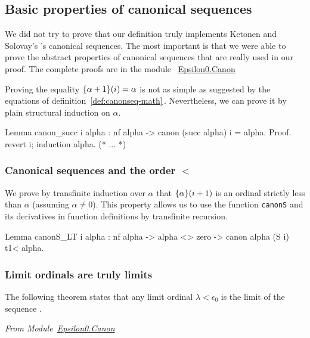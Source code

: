 \subsection{Basic properties of canonical sequences}

We did not  try to prove that our definition truly implements Ketonen and Solovay's  \cite{KS81}'s canonical sequences. The most important is that we were able to prove the 
abstract properties  of canonical sequences that are really used in our proof. The complete proofs are in the module
~\href{../theories/html/hydras.Epsilon0.Canon.html}{Epsilon0.Canon}


Proving the equality $\mbox{$\{\alpha+1\}(i)$}=\alpha$ is not 
as simple as suggested by the equations of definition~\ref{def:canonseq-math}\,.
Nevertheless, we can prove it by  plain structural induction on $\alpha$.

\begin{Coqsrc}
  Lemma canon_succ i alpha :
  nf alpha -> canon (succ alpha) i = alpha.
Proof.
 revert i; induction alpha.
 (* ... *)
\end{Coqsrc}

\subsubsection{Canonical sequences and the order $<$}


We prove by transfinite induction over $\alpha$ that $\mbox{$\{\alpha\}(i+1)$}$ is an ordinal strictly less than $\alpha$ (assuming $\alpha\not=0$). This property allows us to use the function \texttt{canonS} and its derivatives in function definitions by transfinite recursion.

\label{lemma:canonS_LT}
\begin{Coqsrc}
Lemma canonS_LT i alpha :
  nf alpha -> alpha <> zero ->
  canon alpha (S i) t1<  alpha.
\end{Coqsrc}


\subsubsection{Limit ordinals are truly limits}
The following theorem states that any limit ordinal $\lambda<\epsilon_0$ 
is the limit of the sequence .


\vspace{4pt}
\emph{From Module~\href{../theories/html/hydras.Epsilon0.Canon.html\#canonS_limit_strong}{Epsilon0.Canon}}


